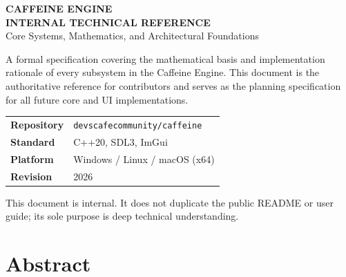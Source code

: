 \documentclass[12pt, a4paper]{report}
\theoremstyle{definition}
\theoremstyle{remark}
\begin{document}
\pagestyle{empty}

\begin{titlepage}
  \centering
  \vspace*{2cm}

  {\color{darkblue}\sffamily\Huge\bfseries CAFFEINE ENGINE}\\[0.6em]
  {\color{darkblue}\sffamily\Large\bfseries INTERNAL TECHNICAL REFERENCE}\\[1.2em]
  {\sffamily\large Core Systems, Mathematics, and Architectural Foundations}

  \vspace{2.5cm}

  {\sffamily\normalsize
    A formal specification covering the mathematical basis and implementation
    rationale of every subsystem in the Caffeine Engine.
    This document is the authoritative reference for contributors and serves as
    the planning specification for all future core and UI implementations.
  }

  \vfill

  \begin{tabular}{ll}
    \textbf{Repository} & \texttt{devscafecommunity/caffeine} \\[0.4em]
    \textbf{Standard}   & C++20, SDL3, ImGui \\[0.4em]
    \textbf{Platform}   & Windows / Linux / macOS (x64) \\[0.4em]
    \textbf{Revision}   & 2026 \\
  \end{tabular}

  \vspace{1.5cm}
  {\small\color{gray} This document is internal. It does not duplicate the public
  README or user guide; its sole purpose is deep technical understanding.}
\end{titlepage}

\chapter*{Abstract}
\end{document}

